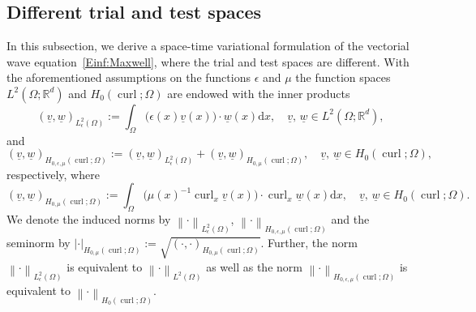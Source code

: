 \documentclass[a4paper,11pt]{article}
\newcommand{\R}{\mathbb R}
\newcommand{\cu}{\operatorname{curl}}
\renewcommand{\vec}[1]{\underline{#1}}
\newcommand{\abs}[1]{\left\lvert{#1}\right\rvert}
\newcommand{\norm}[1]{{\left\lVert{#1}\right\rVert}}
\begin{document}
\subsection{Different trial and test spaces}

In this subsection, we derive a space-time variational formulation of the vectorial wave equation~\eqref{Einf:Maxwell}, where the trial and test spaces are different. With the aforementioned assumptions on the functions $\epsilon$ and $\mu$ the function spaces $L^2(\Omega;\R^d)$ and $H_0(\cu;\Omega)$ are endowed with the inner products
\begin{equation*}
	(\vec v, \vec w)_{L^2_\epsilon(\Omega)} := \int_\Omega  \big( \epsilon(x) \vec v(x) \big) \cdot \vec w(x) \mathrm dx, \quad \vec v, \, \vec w \in L^2(\Omega;\R^d),
\end{equation*}
and 
\begin{equation*}
	(\vec v, \vec w)_{H_{0,\epsilon,\mu}(\cu;\Omega)} := (\vec v, \vec w)_{L^2_\epsilon(\Omega)} +  (\vec v, \vec w)_{H_{0,\mu}(\cu;\Omega)}, \quad \vec v, \, \vec w \in H_0(\cu;\Omega),
\end{equation*}
respectively, where
\begin{equation*}
	(\vec v, \vec w)_{H_{0,\mu}(\cu;\Omega)} := \int_\Omega \big( \mu(x)^{-1} \cu_x \vec v(x) \big) \cdot \cu_x \vec w(x)  \mathrm dx, \quad \vec v, \, \vec w \in H_0(\cu;\Omega).
\end{equation*}
We denote the induced norms by $\norm{\cdot}_{L^2_\epsilon(\Omega)}$, $\norm{\cdot}_{H_{0,\epsilon,\mu}(\cu;\Omega)}$ and the seminorm by $\abs{\cdot}_{H_{0,\mu}(\cu;\Omega)} := \sqrt{(\cdot, \cdot)_{H_{0,\mu}(\cu;\Omega)}}$. Further, the norm $\norm{\cdot}_{L^2_\epsilon(\Omega)}$ is equivalent to $\norm{\cdot}_{L^2(\Omega)}$ as well as 
the norm $\norm{\cdot}_{H_{0,\epsilon,\mu}(\cu;\Omega)}$ is equivalent to $\norm{\cdot}_{H_0(\cu;\Omega)}$.
\end{document}
